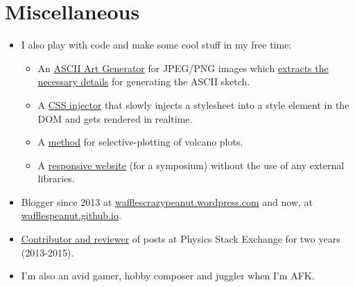 \documentclass[11pt,a4paper,sans]{moderncv}        %
\newcommand\chref[3][linky]{\href{#2}{\color{#1}#3}}
\begin{document}
\section{Miscellaneous}
\begin{itemize}
\item I also play with code and make some cool stuff in my free time:
\begin{itemize}
\item An \chref{https://ascii-gen.herokuapp.com/}{ASCII Art Generator} for JPEG/PNG images which \chref{http://wafflespeanut.github.io/blog/2017/03/01/ascii-sketch/}{extracts the necessary details} for generating the ASCII sketch.
\item A \chref{https://github.com/wafflespeanut/AISH}{CSS injector} that slowly injects a stylesheet into a style element in the DOM and gets rendered in realtime.
\item A \chref{https://github.com/wafflespeanut/volcano-min}{method} for selective-plotting of volcano plots.
\item A \chref{https://github.com/wafflespeanut/flight-2016}{responsive website} (for a symposium) without the use of any external libraries.
\end{itemize}
\item Blogger since 2013 at \chref{https://wafflescrazypeanut.wordpress.com/}{wafflescrazypeanut.wordpress.com} and now, at \chref{https://wafflespeanut.github.io/}{wafflespeanut.github.io}.
\item \chref{https://physics.stackexchange.com/users/11062}{Contributor and reviewer} of posts at Physics Stack Exchange for two years (2013-2015).
\item I'm also an avid gamer, hobby composer and juggler when I'm AFK.
\end{itemize}


\end{document}

